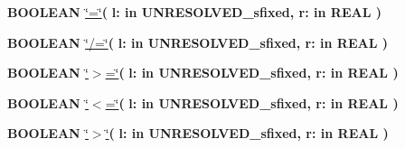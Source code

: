 \begin{DoxyCompactItemize}
\item 
{\bfseries {\bfseries \textcolor{comment}{B\+O\+O\+L\+E\+A\+N}\textcolor{vhdlchar}{ }}} \hyperlink{classfixed__pkg_a7949e9258ea0749e3b35961feea8db87}{\char`\"{}=\char`\"{}}{\bfseries  ( }{\bfseries \textcolor{vhdlchar}{l\+: }\textcolor{stringliteral}{in }\textcolor{vhdlchar}{U\+N\+R\+E\+S\+O\+L\+V\+E\+D\+\_\+sfixed}}{\bfseries  , \textcolor{vhdlchar}{r\+: }\textcolor{stringliteral}{in }{\bfseries \textcolor{comment}{R\+E\+A\+L}\textcolor{vhdlchar}{ }}}{\bfseries  )} 
\item 
{\bfseries {\bfseries \textcolor{comment}{B\+O\+O\+L\+E\+A\+N}\textcolor{vhdlchar}{ }}} \hyperlink{classfixed__pkg_a00087aded97b434060226b9ba63a9077}{\char`\"{}/=\char`\"{}}{\bfseries  ( }{\bfseries \textcolor{vhdlchar}{l\+: }\textcolor{stringliteral}{in }\textcolor{vhdlchar}{U\+N\+R\+E\+S\+O\+L\+V\+E\+D\+\_\+sfixed}}{\bfseries  , \textcolor{vhdlchar}{r\+: }\textcolor{stringliteral}{in }{\bfseries \textcolor{comment}{R\+E\+A\+L}\textcolor{vhdlchar}{ }}}{\bfseries  )} 
\item 
{\bfseries {\bfseries \textcolor{comment}{B\+O\+O\+L\+E\+A\+N}\textcolor{vhdlchar}{ }}} \hyperlink{classfixed__pkg_a4cd07e388cdbb3996dd11f56781d3758}{\char`\"{}$>$=\char`\"{}}{\bfseries  ( }{\bfseries \textcolor{vhdlchar}{l\+: }\textcolor{stringliteral}{in }\textcolor{vhdlchar}{U\+N\+R\+E\+S\+O\+L\+V\+E\+D\+\_\+sfixed}}{\bfseries  , \textcolor{vhdlchar}{r\+: }\textcolor{stringliteral}{in }{\bfseries \textcolor{comment}{R\+E\+A\+L}\textcolor{vhdlchar}{ }}}{\bfseries  )} 
\item 
{\bfseries {\bfseries \textcolor{comment}{B\+O\+O\+L\+E\+A\+N}\textcolor{vhdlchar}{ }}} \hyperlink{classfixed__pkg_a65b73a94d4fe541a941f431175b342b7}{\char`\"{}$<$=\char`\"{}}{\bfseries  ( }{\bfseries \textcolor{vhdlchar}{l\+: }\textcolor{stringliteral}{in }\textcolor{vhdlchar}{U\+N\+R\+E\+S\+O\+L\+V\+E\+D\+\_\+sfixed}}{\bfseries  , \textcolor{vhdlchar}{r\+: }\textcolor{stringliteral}{in }{\bfseries \textcolor{comment}{R\+E\+A\+L}\textcolor{vhdlchar}{ }}}{\bfseries  )} 
\item 
{\bfseries {\bfseries \textcolor{comment}{B\+O\+O\+L\+E\+A\+N}\textcolor{vhdlchar}{ }}} \hyperlink{classfixed__pkg_ac6c82329bf849852be997a3d0a737cf9}{\char`\"{}$>$\char`\"{}}{\bfseries  ( }{\bfseries \textcolor{vhdlchar}{l\+: }\textcolor{stringliteral}{in }\textcolor{vhdlchar}{U\+N\+R\+E\+S\+O\+L\+V\+E\+D\+\_\+sfixed}}{\bfseries  , \textcolor{vhdlchar}{r\+: }\textcolor{stringliteral}{in }{\bfseries \textcolor{comment}{R\+E\+A\+L}\textcolor{vhdlchar}{ }}}{\bfseries  )} 

\end{DoxyCompactItemize}
